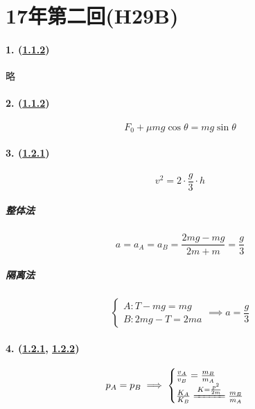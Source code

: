 
\section{17年第二回(H29B)}

\paragraph{1. (\hyperref[subsec:1.1.2]{1.1.2})} 略
\paragraph{2. (\hyperref[subsec:1.1.2]{1.1.2})}

\begin{equation*}
    F_0+\mu mg\cos\theta=mg\sin\theta
\end{equation*}

\paragraph{3. (\hyperref[subsec:1.2.1]{1.2.1})}

\begin{equation*}
    v^2=2\cdot\frac{g}{3}\cdot h
\end{equation*}

\subparagraph{整体法}

\begin{equation*}
    a=a_A=a_B=\frac{2mg-mg}{2m+m}=\frac{g}{3}
\end{equation*}

\subparagraph{隔离法}

\begin{equation*}
    \begin{cases}
        A: T-mg=mg\\
        B: 2mg-T=2ma
    \end{cases}\implies
    a=\frac{g}{3}
\end{equation*}

\paragraph{4. (\hyperref[subsec:1.2.1]{1.2.1}, \hyperref[subsec:1.2.2]{1.2.2})}

\begin{gather*}
    p_A=p_B\implies
    \begin{cases}
        \frac{v_A}{v_B}=\frac{m_B}{m_A}\\
        \frac{K_A}{K_B}\xlongequal{K=\frac{p^2}{2m}}\frac{m_B}{m_A}
    \end{cases}
\end{gather*}

